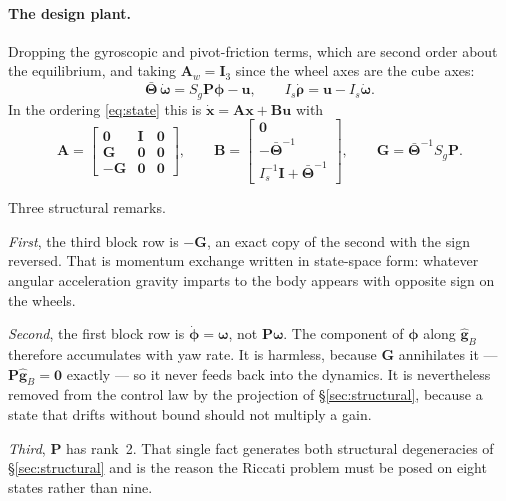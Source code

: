 \paragraph{The design plant.} Dropping the gyroscopic and pivot-friction
terms, which are second order about the equilibrium, and taking
$\bm{A}_w = \bm{I}_3$ since the wheel axes are the cube axes:
%
\begin{equation}
  \bar{\bm{\Theta}}\,\dot{\bm{\omega}} = S_g\bm{P}\bm{\phi} - \bm{u},
  \qquad
  I_s\dot{\bm{\rho}} = \bm{u} - I_s\dot{\bm{\omega}}.
\end{equation}
%
In the ordering \eqref{eq:state} this is $\dot{\bm{x}} = \bm{A}\bm{x} +
\bm{B}\bm{u}$ with
%
\begin{equation}
  \bm{A} = \begin{bmatrix}
      \bm{0} & \bm{I} & \bm{0}\\
      \bm{G} & \bm{0} & \bm{0}\\
     -\bm{G} & \bm{0} & \bm{0}
    \end{bmatrix},
  \qquad
  \bm{B} = \begin{bmatrix}
      \bm{0}\\
      -\bar{\bm{\Theta}}^{-1}\\
      I_s^{-1}\bm{I} + \bar{\bm{\Theta}}^{-1}
    \end{bmatrix},
  \qquad
  \bm{G} = \bar{\bm{\Theta}}^{-1} S_g \bm{P}.
  \label{eq:AB}
\end{equation}

Three structural remarks.

\emph{First}, the third block row is $-\bm{G}$, an exact copy of the second
with the sign reversed. That is momentum exchange written in state-space
form: whatever angular acceleration gravity imparts to the body appears with
opposite sign on the wheels.

\emph{Second}, the first block row is $\dot{\bm{\phi}} = \bm{\omega}$, not
$\bm{P}\bm{\omega}$. The component of $\bm{\phi}$ along $\hat{\bm{g}}_B$
therefore accumulates with yaw rate. It is harmless, because $\bm{G}$
annihilates it --- $\bm{P}\hat{\bm{g}}_B = \bm{0}$ exactly --- so it never
feeds back into the dynamics. It is nevertheless removed from the control law
by the projection of \S\ref{sec:structural}, because a state that drifts
without bound should not multiply a gain.

\emph{Third}, $\bm{P}$ has rank~2. That single fact generates both structural
degeneracies of \S\ref{sec:structural} and is the reason the Riccati problem
must be posed on eight states rather than nine.

